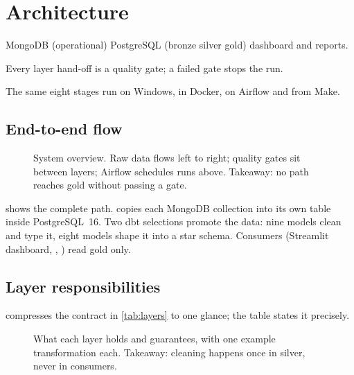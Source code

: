\chapter{Architecture}

\begin{glance}
\item MongoDB (operational) \textrightarrow{} PostgreSQL  (bronze \textrightarrow{} silver \textrightarrow{} gold) \textrightarrow{} dashboard and reports.
\item Every layer hand-off is a quality gate; a failed gate stops the run.
\item The same eight stages run on Windows, in Docker, on Airflow and from Make.
\end{glance}

\section{End-to-end flow}

\begin{figure}[tbp]
\centering

\caption{System overview. Raw data flows left to right; quality gates sit between layers; Airflow schedules runs above. Takeaway: no path reaches gold without passing a gate.}
\label{fig:arch-overview}
\end{figure}

 shows the complete path.  copies each MongoDB collection into its own  table inside PostgreSQL~16. Two dbt selections promote the data: nine  models clean and type it, eight  models shape it into a star schema. Consumers (Streamlit dashboard, , ) read gold only.

\section{Layer responsibilities}

 compresses the contract in \cref{tab:layers} to one glance; the table states it precisely.

\begin{figure}[tbp]
\centering

\caption{What each layer holds and guarantees, with one example transformation each. Takeaway: cleaning happens once in silver, never in consumers.}
\label{fig:layers}
\end{figure}

